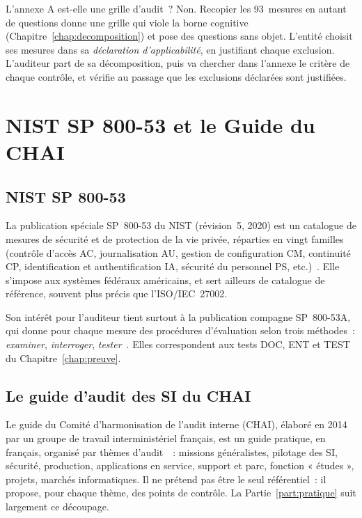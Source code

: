 \begin{boiteRemarque}{L'annexe A est-elle une grille d'audit~?}
Non. Recopier les 93~mesures en autant de questions donne une grille qui
viole la borne cognitive (Chapitre~\ref{chap:decomposition}) et pose des
questions sans objet. L'entité choisit ses mesures dans sa \emph{déclaration
d'applicabilité}, en justifiant chaque exclusion. L'auditeur part de sa
décomposition, puis va chercher dans l'annexe le critère de chaque contrôle,
et vérifie au passage que les exclusions déclarées sont justifiées.
\end{boiteRemarque}

\section{NIST SP 800-53 et le Guide du CHAI}
\label{sec:c11-autres}

\subsection{NIST SP 800-53}

La publication spéciale SP~800-53 du NIST (révision~5, 2020) est un
catalogue de mesures de sécurité et de protection de la vie privée,
réparties en vingt familles (contrôle d'accès AC, journalisation AU,
gestion de configuration CM, continuité CP, identification et
authentification IA, sécurité du personnel PS, etc.)~\cite{nist2020sp80053}.
Elle s'impose aux systèmes fédéraux américains, et sert ailleurs de
catalogue de référence, souvent plus précis que l'ISO/IEC~27002.

Son intérêt pour l'auditeur tient surtout à la publication compagne
SP~800-53A, qui donne pour chaque mesure des procédures d'évaluation selon
trois méthodes~: \emph{examiner}, \emph{interroger}, \emph{tester}~\cite{nist2022sp80053a}.
Elles correspondent aux tests DOC, ENT et TEST du
Chapitre~\ref{chap:preuve}.

\subsection{Le guide d'audit des SI du CHAI}

Le guide du Comité d'harmonisation de l'audit interne (CHAI), élaboré en
2014 par un groupe de travail interministériel français, est un guide
pratique, en français, organisé par thèmes d'audit~\cite{chai2014guide}~:
missions généralistes, pilotage des SI, sécurité, production, applications
en service, support et parc, fonction « études », projets, marchés
informatiques. Il ne prétend pas être le seul référentiel~: il propose,
pour chaque thème, des points de contrôle. La Partie~\ref{part:pratique}
suit largement ce découpage.

